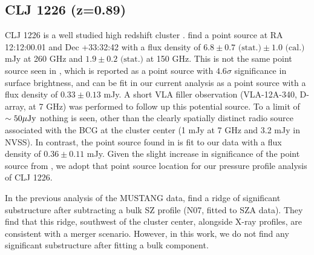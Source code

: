 \documentclass[iop,numberedappendix,apj]{emulateapj}
\begin{document}



\subsection{CLJ 1226 (z=0.89)}
\label{sec:results_clj1226}


CLJ 1226 is a well studied high redshift cluster \citep[e.g.][]{mroczkowski2009,bulbul2010,adam2015}. 
\citet{adam2015} find a point source at RA 12:12:00.01 and Dec +33:32:42 with a flux density of 
$6.8 \pm 0.7 \text{ (stat.)} \pm 1.0 \text{ (cal.)}$ mJy at 260 GHz and $1.9 \pm 0.2 \text{ (stat.)}$ at 150 GHz. 
This is not the same point source seen in \citet{korngut2011}, which is reported as a point source
with $4.6\sigma$ significance in surface brightness, and can be fit in our current analysis as a point source 
with a flux density of $0.33 \pm 0.13$ mJy. A short VLA filler observation (VLA-12A-340, D-array, at 7 GHz) 
was performed to follow up this potential source. To a limit of $\sim 50 {\rm \mu Jy}$ nothing is seen, 
other than the clearly spatially distinct radio source associated with the BCG at the cluster center 
(1 mJy at 7 GHz and 3.2 mJy in NVSS). In contrast, the point source found in \citet{adam2015} is fit to our 
data with a flux density of $0.36 \pm 0.11$ mJy. Given the slight increase in significance of the point source
from \citet{adam2015}, we adopt that point source location for our pressure profile analysis of CLJ 1226.
 

In the previous analysis of the MUSTANG data, \citet{korngut2011} find a ridge of significant substructure after 
subtracting a bulk SZ profile (N07, fitted to SZA data). They find that this ridge, southwest of the cluster
center, alongside X-ray profiles, are consistent with a merger scenario. However, in this work, we do not find
any significant substructure after fitting a bulk component.
\end{document}
